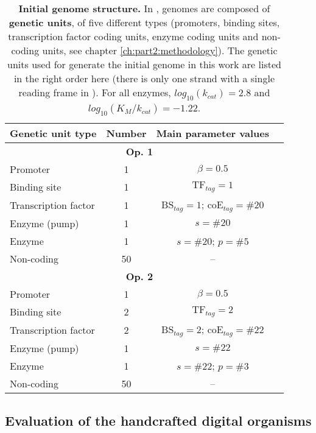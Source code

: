 \begin{table}
\begin{adjustwidth}{-0in}{0in}
\centering
\caption[Initial genome structure.]{{\bf Initial genome structure.} In {\EvoEvoSim}, genomes are composed of \textbf{genetic units}, of five different types (promoters, binding sites, transcription factor coding units, enzyme coding units and non-coding units, see chapter \ref{ch:part2:methodology}). The genetic units used for generate the initial genome in this work are listed in the right order here (there is only one strand with a single reading frame in {\EvoEvoSim}). For all enzymes, $log_{10}(k_{cat})=2.8$ and $log_{10}(K_M/k_{cat})=-1.22$.}
\begin{tabular}{|l|c|c|c|}
\hline
Genetic unit type & Number & Main parameter values\\
\hline
\multicolumn{3}{|c|}{\textbf{Op. 1}}\\
\hline
Promoter & 1 & $\beta = 0.5$\\
Binding site & 1 & $\text{TF}_{tag} = 1$\\
Transcription factor & 1 & $\text{BS}_{tag} = 1$; $\text{coE}_{tag} = \#20$\\
Enzyme (pump) & 1 & $s=\#20$\\
Enzyme & 1 & $s=\#20$; $p=\#5$\\
Non-coding & 50 & --\\
\hline
\multicolumn{3}{|c|}{\textbf{Op. 2}}\\
\hline
Promoter & 1 & $\beta = 0.5$\\
Binding site & 2 & $\text{TF}_{tag} = 2$\\
Transcription factor & 2 & $\text{BS}_{tag} = 2$; $\text{coE}_{tag} = \#22$\\
Enzyme (pump) & 1 & $s=\#22$\\
Enzyme & 1 & $s=\#22$; $p=\#3$\\
Non-coding & 50 & --\\
\hline
\end{tabular}
\label{table:part2:second_result:initial_genome_structure}
\end{adjustwidth}
\end{table}


\subsection{Evaluation of the handcrafted digital organisms}
\label{subsec:part2:second_result:organisms_evaluation}

